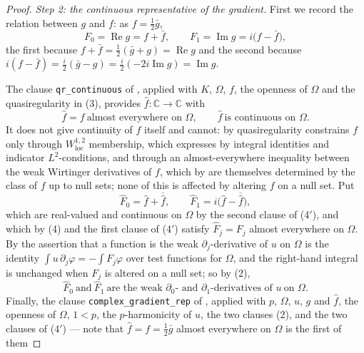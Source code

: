 \begin{proof}
\emph{Step 2: the continuous representative of the gradient.}  First we record
the relation between $g$ and $f$: as $f=\tfrac12\bar g$,
\begin{equation}\tag{4}
  F_0=\operatorname{Re}g=f+\bar f,\qquad
  F_1=\operatorname{Im}g=i\bigl(f-\bar f\bigr),
\end{equation}
the first because $f+\bar f=\tfrac12(\bar g+g)=\operatorname{Re}g$ and the
second because
$i(f-\bar f)=\tfrac{i}{2}(\bar g-g)=\tfrac{i}{2}(-2i\operatorname{Im}g)
=\operatorname{Im}g$.

The clause \texttt{qr\_continuous} of , applied with $K$,
$\Omega$, $f$, the openness of $\Omega$ and the quasiregularity in (3),
provides $\hat f\colon\mathbb{C}\to\mathbb{C}$ with
\begin{equation}\tag{4$'$}
  \hat f=f\ \text{almost everywhere on }\Omega,\qquad
  \hat f\ \text{is continuous on }\Omega .
\end{equation}
It does not give continuity of $f$ itself and cannot: by
 quasiregularity constrains $f$ only through
$W^{1,2}_{\mathrm{loc}}$ membership, which  expresses by
integral identities and indicator $L^2$-conditions, and through an
almost-everywhere inequality between the weak Wirtinger derivatives of $f$,
which by  are themselves determined by the class of
$f$ up to null sets; none of this is affected by altering $f$ on a null set.  Put
\[
  \hat F_0=\hat f+\overline{\hat f},\qquad
  \hat F_1=i\bigl(\hat f-\overline{\hat f}\bigr),
\]
which are real-valued and continuous on $\Omega$ by the second clause of
(4$'$), and which by (4) and the first clause of (4$'$) satisfy
$\hat F_j=F_j$ almost everywhere on $\Omega$.  By  the
assertion that a function is the weak $\partial_j$-derivative of $u$ on
$\Omega$ is the identity $\int u\,\partial_j\varphi=-\int F_j\varphi$ over test
functions for $\Omega$, and the right-hand integral is unchanged when $F_j$ is
altered on a null set; so by (2),
\begin{equation}\tag{4$''$}
  \hat F_0\ \text{and}\ \hat F_1\ \text{are the weak }\partial_0\text{- and }
  \partial_1\text{-derivatives of }u\ \text{on }\Omega .
\end{equation}
Finally, the clause \texttt{complex\_gradient\_rep} of
, applied with $p$, $\Omega$, $u$, $g$ and
$\hat f$, the openness of $\Omega$, $1<p$, the $p$-harmonicity of $u$, the two
clauses (2), and the two clauses of (4$'$) --- note that
$\hat f=f=\tfrac12\bar g$ almost everywhere on $\Omega$ is the first of them

\end{proof}

